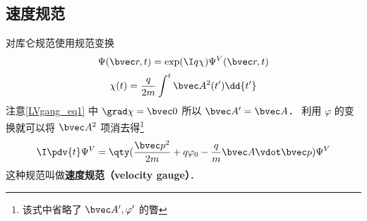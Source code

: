 \subsection{速度规范}
对库仑规范使用规范变换
\begin{equation}\label{LVgaug_eq3}
\Psi(\bvec r, t) = \exp(\I q\chi)\Psi^V(\bvec r, t)
\end{equation}
\begin{equation}\label{LVgaug_eq4}
\chi(t) = \frac{q}{2m} \int^t \bvec A^2(t') \dd{t'}
\end{equation}
注意\autoref{LVgaug_eq1} 中 $\grad \chi = \bvec 0$ 所以 $\bvec A' = \bvec A$． 利用 $\varphi$ 的变换就可以将 $\bvec A^2$ 项消去得\footnote{该式中省略了 $\bvec A', \varphi'$ 的瞥}
\begin{equation}
\I \pdv{t} \Psi^V = \qty(\frac{\bvec p^2}{2m} + q\varphi_0 - \frac{q}{m} \bvec A \vdot \bvec p) \Psi^V
\end{equation}
这种规范叫做\textbf{速度规范（velocity gauge）}．


